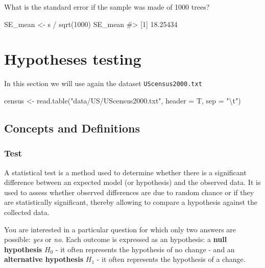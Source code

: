 \documentclass[
  letterpaper,
  DIV=11,
  numbers=noendperiod]{scrreprt}
\newenvironment{Shaded}{\begin{snugshade}}{\end{snugshade}}
\newcommand{\AttributeTok}[1]{\textcolor[rgb]{0.40,0.45,0.13}{#1}}
\newcommand{\CommentTok}[1]{\textcolor[rgb]{0.37,0.37,0.37}{#1}}
\newcommand{\DecValTok}[1]{\textcolor[rgb]{0.68,0.00,0.00}{#1}}
\newcommand{\FunctionTok}[1]{\textcolor[rgb]{0.28,0.35,0.67}{#1}}
\newcommand{\NormalTok}[1]{\textcolor[rgb]{0.00,0.23,0.31}{#1}}
\newcommand{\OtherTok}[1]{\textcolor[rgb]{0.00,0.23,0.31}{#1}}
\newcommand{\SpecialCharTok}[1]{\textcolor[rgb]{0.37,0.37,0.37}{#1}}
\newcommand{\StringTok}[1]{\textcolor[rgb]{0.13,0.47,0.30}{#1}}
\begin{document}
What is the standard error if the sample was made of 1000 trees?

\begin{Shaded}
\begin{Highlighting}[]
\NormalTok{SE\_mean }\OtherTok{\textless{}{-}}\NormalTok{ s }\SpecialCharTok{/} \FunctionTok{sqrt}\NormalTok{(}\DecValTok{1000}\NormalTok{)}
\NormalTok{SE\_mean}
\CommentTok{\#\textgreater{} [1] 18.25434}
\end{Highlighting}
\end{Shaded}

\chapter{Hypotheses testing}\label{hypotheses-testing}

In this section we will use again the dataset \texttt{UScensus2000.txt}

\begin{Shaded}
\begin{Highlighting}[]
\NormalTok{census }\OtherTok{\textless{}{-}} \FunctionTok{read.table}\NormalTok{(}\StringTok{"data/US/UScensus2000.txt"}\NormalTok{, }
                     \AttributeTok{header =}\NormalTok{ T, }\AttributeTok{sep =} \StringTok{"}\SpecialCharTok{\textbackslash{}t}\StringTok{"}\NormalTok{)}
\end{Highlighting}
\end{Shaded}

\section{Concepts and Definitions}\label{concepts-and-definitions}

\subsection{Test}\label{test}

A statistical test is a method used to determine whether there is a
significant difference between an expected model (or hypothesis) and the
observed data. It is used to assess whether observed differences are due
to random chance or if they are statistically significant, thereby
allowing to compare a hypothesis against the collected data.

You are interested in a particular question for which only two answers
are possible: \emph{yes} or \emph{no}. Each outcome is expressed as an
hypothesis: a \textbf{null hypothesis} \(H_0\) - it often represents the
hypothesis of no change - and an \textbf{alternative hypothesis} \(H_1\)
- it often represents the hypothesis of a change.
\end{document}
